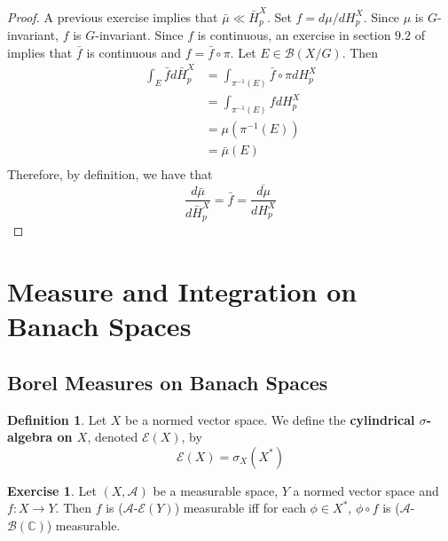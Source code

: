 \documentclass[12pt]{amsart}
\theoremstyle{definition}
\newtheorem{defn}[definition]{Definition}
\newtheorem{ex}[definition]{Exercise}
\newcommand{\sig}{\sigma}
\newcommand{\C}{\mathbb{C}}
\newcommand{\MA}{\mathcal{A}}
\newcommand{\MB}{\mathcal{B}}
\newcommand{\ME}{\mathcal{E}}
\begin{document}
	\begin{proof}
	A previous exercise implies that $\bar{\mu} \ll \bar{H}_p^X$. Set $f = d \mu /d H_p^X$. Since $\mu$ is $G$-invariant, $f$ is $G$-invariant. Since $f$ is continuous, an exercise in section $9.2$ of \cite{analysis} implies that $\bar{f}$ is continuous and $f = \bar{f} \circ \pi$. Let $E \in \MB(X/G)$. Then 
	\begin{align*}
	\int_E \bar{f} d \bar{H}_p^X 
	&= \int_{\pi^{-1}(E)} \bar{f} \circ \pi dH_p^X \\
	&= \int_{\pi^{-1}(E)} f dH_p^X \\
	&= \mu(\pi^{-1}(E)) \\
	&= \bar{\mu}(E) \\
\end{align*}	 
	Therefore, by definition, we have that
	\begin{equation*}
	\frac{d \bar{\mu}}{d \bar{H}_p^X} = \bar{f} = \overline{\frac{d \mu}{d H_p^X}}
	\end{equation*}
	\end{proof}
	
	
	
	
	
	
	
	
	
	
	
	
	
	
	
	
	
	
	
	
	
	
	
	
	
	
	\newpage
	\section{Measure and Integration on Banach Spaces}
	
	\subsection{Borel Measures on Banach Spaces}
	
	\begin{defn}
		Let $X$ be a normed vector space. We define the \textbf{cylindrical $\sig$-algebra on $X$}, denoted $\ME(X)$, by $$\ME(X) = \sig_X(X^*)$$
	\end{defn}

	\begin{ex}
		Let $(X, \MA)$ be a measurable space, $Y$ a normed vector space and $f: X \rightarrow Y$. Then $f$ is ($\MA$-$\ME(Y)$) measurable iff for each $\phi \in X^*$, $\phi \circ f$ is ($\MA$-$\MB(\C)$) measurable. 
	\end{ex}
\end{document}
